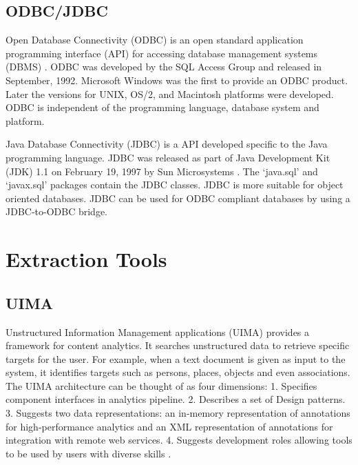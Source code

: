      \pv
	   
\subsection{ODBC/JDBC}

     Open Database Connectivity (ODBC) is an open standard application
     programming interface (API) for accessing database management
     systems (DBMS) \cite{www-odbc}. ODBC was developed by the SQL
     Access Group and released in September, 1992. Microsoft Windows
     was the first to provide an ODBC product. Later the versions for
     UNIX, OS/2, and Macintosh platforms were developed. ODBC is
     independent of the programming language, database system and
     platform.

     Java Database Connectivity (JDBC) is a API developed specific to
     the Java programming language. JDBC was released as part of Java
     Development Kit (JDK) 1.1 on February 19, 1997 by Sun
     Microsystems \cite{www-jdbc}. The ‘java.sql’ and ‘javax.sql’
     packages contain the JDBC classes. JDBC is more suitable for
     object oriented databases. JDBC can be used for ODBC compliant
     databases by using a JDBC-to-ODBC bridge.

\section{Extraction Tools}
\label{S:o-Tools}


\subsection{UIMA }

     Unstructured Information Management applications (UIMA) provides
     a framework for content analytics. It searches unstructured data
     to retrieve specific targets for the user. For example, when a
     text document is given as input to the system, it identifies
     targets such as persons, places, objects and even
     associations. The UIMA
     architecture can be thought of as four dimensions: 1. Specifies
     component interfaces in analytics pipeline.  2. Describes a set
     of Design patterns. 3. Suggests two data representations: an
     in-memory representation of annotations for high-performance
     analytics and an XML representation of annotations for
     integration with remote web services. 4. Suggests development
     roles allowing tools to be used by
     users with diverse skills \cite{www-wiki-uima}.

